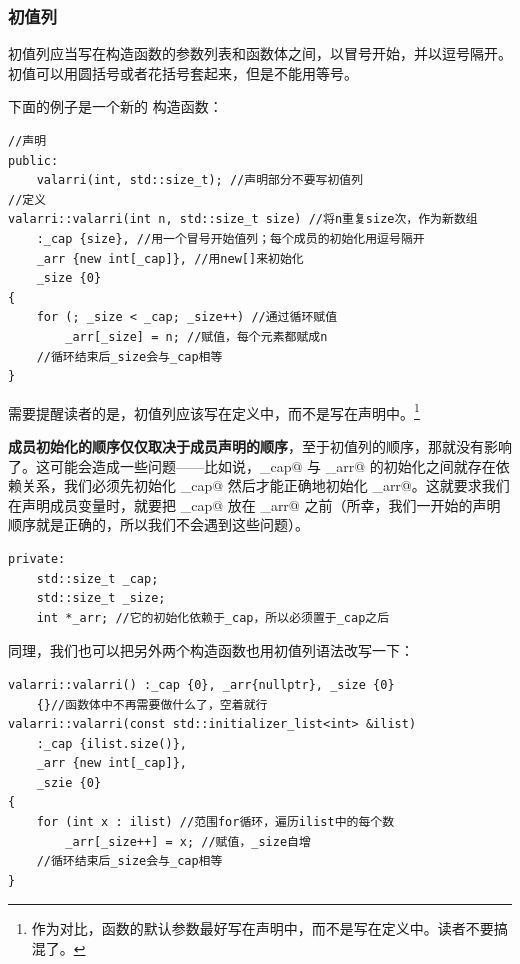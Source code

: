 \subsubsection*{初值列}
初值列应当写在构造函数的参数列表和函数体之间，以冒号开始，并以逗号隔开。初值可以用圆括号或者花括号套起来，但是不能用等号。\par
下面的例子是一个新的 \lstinline@valarri@ 构造函数：
\begin{lstlisting}
//声明
public:
    valarri(int, std::size_t); //声明部分不要写初值列
//定义
valarri::valarri(int n, std::size_t size) //将n重复size次，作为新数组
    :_cap {size}, //用一个冒号开始值列；每个成员的初始化用逗号隔开
    _arr {new int[_cap]}, //用new[]来初始化
    _size {0}
{
    for (; _size < _cap; _size++) //通过循环赋值
        _arr[_size] = n; //赋值，每个元素都赋成n
    //循环结束后_size会与_cap相等
}
\end{lstlisting}
需要提醒读者的是，初值列应该写在定义中，而不是写在声明中。\footnote{作为对比，函数的默认参数最好写在声明中，而不是写在定义中。读者不要搞混了。}\par
\textbf{成员初始化的顺序仅仅取决于成员声明的顺序}，至于初值列的顺序，那就没有影响了。这可能会造成一些问题——比如说，\lstinline@_cap@ 与 \lstinline@_arr@ 的初始化之间就存在依赖关系，我们必须先初始化 \lstinline@_cap@ 然后才能正确地初始化 \lstinline@_arr@。这就要求我们在声明成员变量时，就要把 \lstinline@_cap@ 放在 \lstinline@_arr@ 之前（所幸，我们一开始的声明顺序就是正确的，所以我们不会遇到这些问题）。
\begin{lstlisting}
private:
    std::size_t _cap;
    std::size_t _size;
    int *_arr; //它的初始化依赖于_cap，所以必须置于_cap之后
\end{lstlisting}
同理，我们也可以把另外两个构造函数也用初值列语法改写一下：
\begin{lstlisting}
valarri::valarri() :_cap {0}, _arr{nullptr}, _size {0} 
    {}//函数体中不再需要做什么了，空着就行
valarri::valarri(const std::initializer_list<int> &ilist) 
    :_cap {ilist.size()},
    _arr {new int[_cap]},
    _szie {0}
{
    for (int x : ilist) //范围for循环，遍历ilist中的每个数
        _arr[_size++] = x; //赋值，_size自增
    //循环结束后_size会与_cap相等
}
\end{lstlisting}
